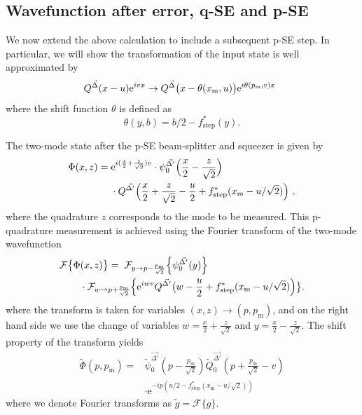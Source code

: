 \documentclass[prx,reprint,superscriptaddress,longbibliography,floatfix,nofootinbib]{revtex4-1}
\begin{document}
\subsection{Wavefunction after error, q-SE and p-SE}
We now extend the above calculation to include a subsequent p-SE step. In particular, we will show the transformation of the input state is well approximated by
\begin{equation}
\label{eq:step_result} 
Q^{\vec{\Delta}}(x-u)\text{e}^{ivx} \rightarrow Q^{\vec{\Delta}}\big(x-\theta(x_\mathrm{m},u)\big)\text{e}^{i\theta(p_\mathrm{m},v)x} \hspace{0.1cm} \,
\end{equation}
where the shift function $\theta$ is defined as
\begin{equation}\label{eq:theta}
\theta(y,b)=b/2-f^{*}_\mathrm{step}(y).
\end{equation}

The two-mode state after the p-SE beam-splitter and squeezer is given by
\begin{equation}
\begin{split}
    \Phi(x,z) = \hspace{0.1cm} & \text{e}^{i(\frac{x}{2}+\frac{z}{\sqrt{2}})v} \cdot \psi^{\vec{\Delta'}}_{0}\Big(\frac{x}{2}-\frac{z}{\sqrt{2}}\Big) \\
    & \cdot Q^{\vec{\Delta'}}\Big(\frac{x}{2}+\frac{z}{\sqrt{2}}-\frac{u}{2}+f^{*}_\mathrm{step}(x_\mathrm{m}-u/\sqrt{2})\Big) \ ,
    \end{split}
\end{equation}
\noindent where the quadrature $z$ corresponds to the mode to be measured. This p-quadrature measurement is achieved using the Fourier transform of the two-mode wavefunction
\begin{equation}
\begin{split}
    \mathcal{F}\big\{\Phi &(x,z)\big\}  = \hspace{0.1cm} \mathcal{F}_{y\rightarrow p-\frac{p_{\text{m}}}{\sqrt{2}}}\Big\{ \psi^{\vec{\Delta'}}_{0}(y)\Big\} \\ & \cdot 
    \mathcal{F}_{w\rightarrow p+\frac{p_{\text{m}}}{\sqrt{2}}}\Big{\{} \text{e}^{iwv} Q^{\vec{\Delta'}}\big{(} w-\frac{u}{2}+f^{*}_\text{step}(x_\mathrm{m}-u/\sqrt{2})\Big{)} \big{\}} .
    \end{split}
\end{equation}
where the transform is taken for variables $(x,z) \rightarrow (p,p_\text{m})$, and on the right hand side we use the change of variables $w = \frac{x}{2}+\frac{z}{\sqrt{2}}$ and $y = \frac{x}{2}-\frac{z}{\sqrt{2}}$. The shift property of the transform yields 
\begin{equation}
\begin{split}\label{eq:pSE_wavefunction}
    \tilde{\Phi}(p,p_\mathrm{m}) = &\tilde{\psi}^{\vec{\Delta'}}_{0}(p-\frac{p_\mathrm{m}}{\sqrt{2}})\tilde{Q}^{\vec{\Delta'}}_{0}(p+\frac{p_\mathrm{m}}{\sqrt{2}}-v) \\
    &\cdot \text{e}^{-ip(u/2-f^{*}_\text{step}(x_\mathrm{m}-u/\sqrt{2}))}
    \end{split}
\end{equation}
where we denote Fourier transforms as $\tilde{g}=\mathcal{F}\{g\}$.
\end{document}
